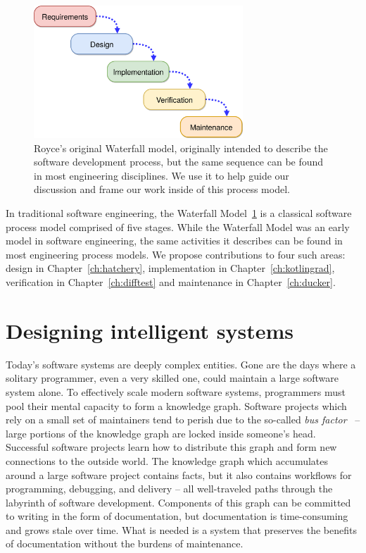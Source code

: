 \documentclass[12pt,initial,twoside,maitrise]{dms}
\numberwithin{equation}{section}
\numberwithin{table}{chapter}
\numberwithin{figure}{chapter}
\begin{document}
\begin{figure}
    \centering
    \includegraphics[width=0.70\textwidth]{waterfall_diagram.png}
    \caption{Royce's original Waterfall model, originally intended to describe the software development process, but the same sequence can be found in most engineering disciplines. We use it to help guide our discussion and frame our work inside of this process model.\vspace{-10}}
    \label{fig:waterfall_model}
\end{figure}

In traditional software engineering, the Waterfall Model~\ref{fig:waterfall_model} is a classical software process model comprised of five stages. While the Waterfall Model was an early model in software engineering, the same activities it describes can be found in most engineering process models. We propose contributions to four such areas: design in Chapter~\ref{ch:hatchery}, implementation in Chapter~\ref{ch:kotlingrad}, verification in Chapter~\ref{ch:difftest} and maintenance in Chapter~\ref{ch:ducker}.

\section{Designing intelligent systems}

Today's software systems are deeply complex entities. Gone are the days where a solitary programmer, even a very skilled one, could maintain a large software system alone. To effectively scale modern software systems, programmers must pool their mental capacity to form a knowledge graph. Software projects which rely on a small set of maintainers tend to perish due to the so-called \textit{bus factor}~\citep{cosentino2015assessing} -- large portions of the knowledge graph are locked inside someone's head. Successful software projects learn how to distribute this graph and form new connections to the outside world. The knowledge graph which accumulates around a large software project contains facts, but it also contains workflows for programming, debugging, and delivery -- all well-traveled paths through the labyrinth of software development. Components of this graph can be committed to writing in the form of documentation, but documentation is time-consuming and grows stale over time. What is needed is a system that preserves the benefits of documentation without the burdens of maintenance.
\end{document}
